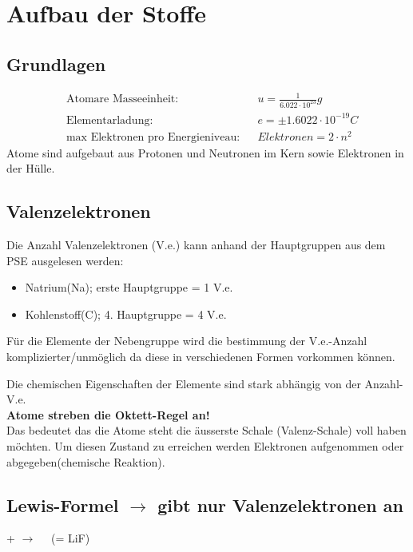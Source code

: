 \section{Aufbau der Stoffe}

\subsection{Grundlagen}
    \vspace{-0.6cm}
    \begin{align*}
        &\text{Atomare Masseeinheit:} &&u = \frac{1}{6.022\cdot10^{23}}g\\
        &\text{Elementarladung:} &&e = \pm 1.6022 \cdot 10^{-19}C\\
        &\text{max Elektronen pro Energieniveau:} &&Elektronen = 2 \cdot n^{2}
    \end{align*}
    \vspace{-0.1cm}
    Atome sind aufgebaut aus Protonen und Neutronen im Kern sowie Elektronen in der Hülle.

\subsection{Valenzelektronen}
    Die Anzahl Valenzelektronen (V.e.) kann anhand der Hauptgruppen aus dem PSE ausgelesen werden:
    \begin{itemize}
        \item Natrium(Na); erste Hauptgruppe = 1 V.e.
        \item Kohlenstoff(C); 4. Hauptgruppe = 4 V.e.
    \end{itemize}  
    Für die Elemente der Nebengruppe wird die bestimmung der V.e.-Anzahl komplizierter/unmöglich da diese in verschiedenen Formen vorkommen können.

    Die chemischen Eigenschaften der Elemente sind stark abhängig von der Anzahl-V.e. \\
    \textbf{Atome streben die Oktett-Regel an!} \\
    Das bedeutet das die Atome steht die äusserste Schale (Valenz-Schale) voll haben möchten. Um diesen Zustand zu erreichen werden Elektronen aufgenommen oder abgegeben(chemische Reaktion).

\subsection{Lewis-Formel $\rightarrow$ gibt nur Valenzelektronen an}
    \begin{center}
         +
        $\longrightarrow$
        $\quad$(= LiF)
    \end{center}
    \vspace{-0.6cm}
